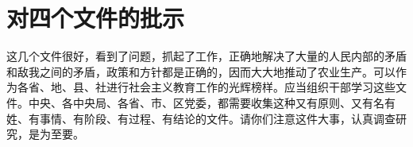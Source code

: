 \section[对四个文件的批示（一九六三年五月八日）]{对四个文件的批示}


这几个文件很好，看到了问题，抓起了工作，正确地解决了大量的人民内部的矛盾和敌我之间的矛盾，政策和方针都是正确的，因而大大地推动了农业生产。可以作为各省、地、县、社进行社会主义教育工作的光辉榜样。应当组织干部学习这些文件。中央、各中央局、各省、市、区党委，都需要收集这种又有原则、又有名有姓、有事情、有阶段、有过程、有结论的文件。请你们注意这件大事，认真调查研究，是为至要。


